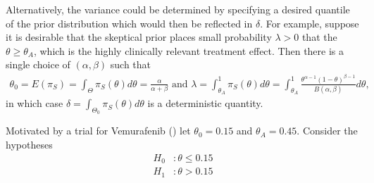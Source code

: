 \documentclass[12pt]{article}
\begin{document}
Alternatively, the variance could be determined by specifying a desired quantile of the prior distribution which would then be reflected in $\delta$. For example, suppose it is desirable that the skeptical prior places small probability $\lambda>0$ that the $\theta\geq\theta_A$, which is the highly clinically relevant treatment effect. Then there is a single choice of $(\alpha,\beta)$ such that
\begin{align*}
\theta_0=E(\pi_S)=\int_{\Theta}\pi_S(\theta)d\theta=\frac{\alpha}{\alpha+\beta}\text{ and }\lambda=\int_{\theta_A}^{1}\pi_S(\theta)d\theta=\int_{\theta_A}^{1}\frac{\theta^{\alpha-1}(1-\theta)^{\beta-1}}{B(\alpha,\beta)}d\theta,
\end{align*}
in which case $\delta=\int_{\Theta_0}\pi_S(\theta)d\theta$ is a deterministic quantity.

Motivated by a trial for Vemurafenib (\cite{Hyman2015}) let $\theta_0=0.15$ and $\theta_A=0.45$. Consider the hypotheses
\begin{align*}
H_0&:\theta\leq 0.15\\
H_1&:\theta>0.15
\end{align*}
\end{document}
